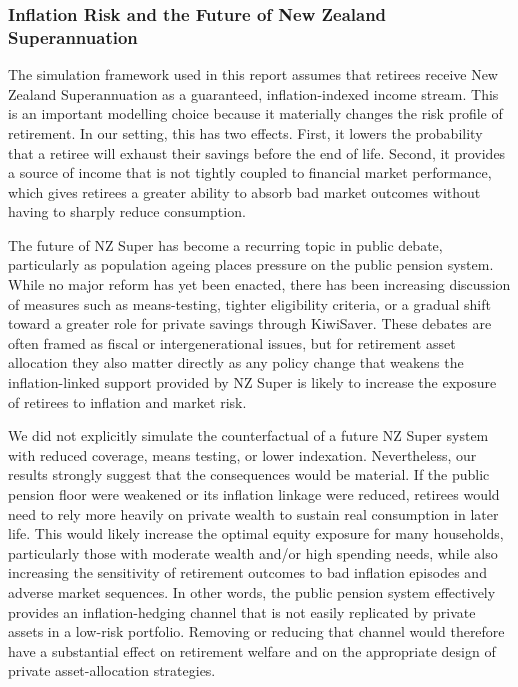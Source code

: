 \documentclass[11pt]{article}
\begin{document}
\subsubsection{Inflation Risk and the Future of New Zealand Superannuation}

The simulation framework used in this report assumes that retirees receive New Zealand Superannuation as a guaranteed, inflation-indexed income stream. This is an important modelling choice because it materially changes the risk profile of retirement. In our setting, this has two effects. First, it lowers the probability that a retiree will exhaust their savings before the end of life. Second, it provides a source of income that is not tightly coupled to financial market performance, which gives retirees a greater ability to absorb bad market outcomes without having to sharply reduce consumption.

The future of NZ Super has become a recurring topic in public debate, particularly as population ageing places pressure on the public pension system. While no major reform has yet been enacted, there has been increasing discussion of measures such as means-testing, tighter eligibility criteria, or a gradual shift toward a greater role for private savings through KiwiSaver. These debates are often framed as fiscal or intergenerational issues, but for retirement asset allocation they also matter directly as any policy change that weakens the inflation-linked support provided by NZ Super is likely to increase the exposure of retirees to inflation and market risk.

We did not explicitly simulate the counterfactual of a future NZ Super system with reduced coverage, means testing, or lower indexation. Nevertheless, our results strongly suggest that the consequences would be material. If the public pension floor were weakened or its inflation linkage were reduced, retirees would need to rely more heavily on private wealth to sustain real consumption in later life. This would likely increase the optimal equity exposure for many households, particularly those with moderate wealth and/or high spending needs, while also increasing the sensitivity of retirement outcomes to bad inflation episodes and adverse market sequences. In other words, the public pension system effectively provides an inflation-hedging channel that is not easily replicated by private assets in a low-risk portfolio. Removing or reducing that channel would therefore have a substantial effect on retirement welfare and on the appropriate design of private asset-allocation strategies.
\end{document}
